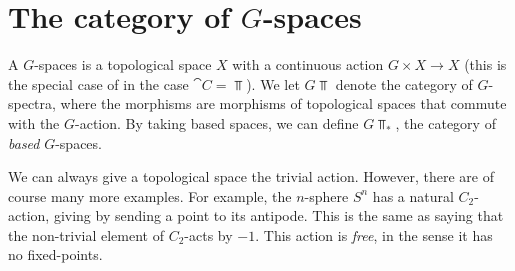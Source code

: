 \documentclass{willowtreebook}
\begin{document}
\section{The category of $G$-spaces}
\begin{definition}
    A $G$-spaces is a topological space $X$ with a continuous action $G \times X \to X$ (this is the special case of  in the case $\cat C = \Top$). We let $G\Top$ denote the category of $G$-spectra, where the morphisms are morphisms of topological spaces that commute with the $G$-action. By taking based spaces, we can define $G\Top_*$, the category of \emph{based} $G$-spaces. 
\end{definition}
\begin{example}
    We can always give a topological space the trivial action. However, there are of course many more examples. For example, the $n$-sphere $S^n$ has a natural $C_2$-action, giving by sending a point to its antipode. This is the same as saying that the non-trivial element of $C_2$-acts by $-1$. This action is \emph{free}, in the sense it has no fixed-points. 
\end{example}
\end{document}
